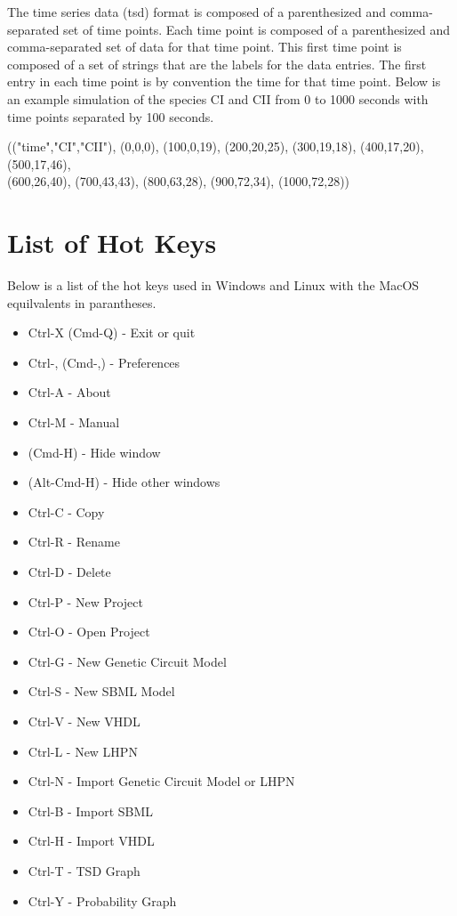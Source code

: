 \documentclass[titlepage,11pt]{article}
\begin{document}
\noindent
The time series data (tsd) format is composed of a
parenthesized and comma-separated set of time points. Each time
point is composed of a parenthesized and comma-separated set of
data for that time point. This first time point is composed of a
set of strings that are the labels for the data entries. The
first entry in each time point is by convention the time for that
time point. Below is an example simulation of the species CI and
CII from 0 to 1000 seconds with time points separated by 100
seconds. 

(("time","CI","CII"), (0,0,0), (100,0,19), (200,20,25), (300,19,18),
(400,17,20), (500,17,46), \\
(600,26,40), (700,43,43), (800,63,28), (900,72,34), (1000,72,28))

\section{\label{HotKeys}List of Hot Keys}

Below is a list of the hot keys used in Windows and Linux with the
MacOS equilvalents in parantheses.
\begin{itemize}
\item Ctrl-X (Cmd-Q) - Exit or quit %
\item Ctrl-, (Cmd-,) - Preferences
\item Ctrl-A - About %
\item Ctrl-M - Manual
\item (Cmd-H) - Hide window
\item (Alt-Cmd-H) - Hide other windows
\item Ctrl-C - Copy %
\item Ctrl-R - Rename %
\item Ctrl-D - Delete %
\item Ctrl-P - New Project %
\item Ctrl-O - Open Project %
\item Ctrl-G - New Genetic Circuit Model %
\item Ctrl-S - New SBML Model %
\item Ctrl-V - New VHDL %
\item Ctrl-L - New LHPN %
\item Ctrl-N - Import Genetic Circuit Model or LHPN %
\item Ctrl-B - Import SBML %
\item Ctrl-H - Import VHDL %
\item Ctrl-T - TSD Graph %
\item Ctrl-Y - Probability Graph %
\end{itemize}
\end{document}
